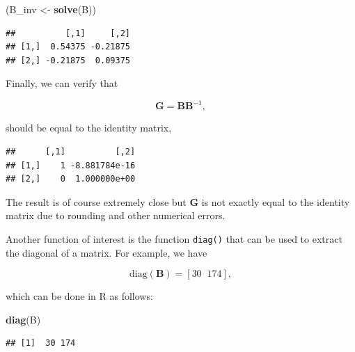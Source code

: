 \documentclass[12pt,]{krantz}
\newenvironment{Shaded}{\begin{snugshade}}{\end{snugshade}}
\newcommand{\KeywordTok}[1]{\textcolor[rgb]{0.27,0.27,0.27}{\textbf{#1}}}
\newcommand{\StringTok}[1]{\textcolor[rgb]{0.5,0.5,0.5}{#1}}
\newcommand{\OperatorTok}[1]{\textcolor[rgb]{0.43,0.43,0.43}{\textbf{#1}}}
\newcommand{\NormalTok}[1]{#1}
\begin{document}
\begin{Shaded}
\begin{Highlighting}[]
\NormalTok{(B_inv <-}\StringTok{ }\KeywordTok{solve}\NormalTok{(B))}
\end{Highlighting}
\end{Shaded}

\begin{verbatim}
##          [,1]     [,2]
## [1,]  0.54375 -0.21875
## [2,] -0.21875  0.09375
\end{verbatim}

Finally, we can verify that

\begin{equation*}
\mathbf{G} = \mathbf{B} \mathbf{B}^{-1},
\end{equation*}

should be equal to the identity matrix,

\begin{Shaded}
\end{Shaded}

\begin{verbatim}
##      [,1]          [,2]
## [1,]    1 -8.881784e-16
## [2,]    0  1.000000e+00
\end{verbatim}

The result is of course extremely close but \(\mathbf{G}\) is not
exactly equal to the identity matrix due to rounding and other numerical
errors.

Another function of interest is the function \texttt{diag()} that can be
used to extract the diagonal of a matrix. For example, we have

\begin{equation*}
\text{diag} \left( \mathbf{B} \right) = \left[30 \;\; 174\right],
\end{equation*}

which can be done in R as follows:

\begin{Shaded}
\begin{Highlighting}[]
\KeywordTok{diag}\NormalTok{(B)}
\end{Highlighting}
\end{Shaded}

\begin{verbatim}
## [1]  30 174
\end{verbatim}
\end{document}
